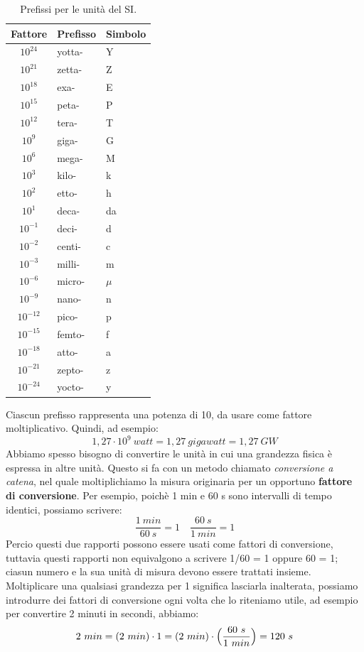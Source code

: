 \documentclass[12pt]{report}
\begin{document}
	\begin{table}[H]
		\centering
		\caption{Prefissi per le unità del SI.}
		\label{tab:prefissi_SI}
		\begin{tabular}{cll}
			\hline
			\textbf{Fattore} & \textbf{Prefisso} & \textbf{Simbolo} \\
			\hline
			$10^{24}$ & yotta- & Y \\
			$10^{21}$ & zetta- & Z \\
			$10^{18}$ & exa- & E \\
			$10^{15}$ & peta- & P \\
			$10^{12}$ & tera- & T \\
			$10^{9}$ & giga- & G \\
			$10^{6}$ & mega- & M \\
			$10^{3}$ & kilo- & k \\
			$10^{2}$ & etto- & h \\
			$10^{1}$ & deca- & da \\
			$10^{-1}$ & deci- & d \\
			$10^{-2}$ & centi- & c \\
			$10^{-3}$ & milli- & m \\
			$10^{-6}$ & micro- & $\mu$ \\
			$10^{-9}$ & nano- & n \\
			$10^{-12}$ & pico- & p \\
			$10^{-15}$ & femto- & f \\
			$10^{-18}$ & atto- & a \\
			$10^{-21}$ & zepto- & z \\
			$10^{-24}$ & yocto- & y \\
			\hline
		\end{tabular}
	\end{table}
	Ciascun prefisso rappresenta una potenza di 10, da usare come fattore moltiplicativo. Quindi, ad esempio:
	\[
	1,27 \cdot 10^9\ watt = 1,27\ gigawatt = 1,27\ GW
	\]
	Abbiamo spesso bisogno di convertire le unità in cui una grandezza fisica  è  espressa in altre unità. Questo si fa con un metodo chiamato \textit{conversione a catena}, nel quale moltiplichiamo la misura originaria per un opportuno \textbf{fattore di conversione}. Per esempio, poichè  1 min e 60 s sono intervalli di tempo identici, possiamo scrivere:
	\[
	\frac{1\ min}{60\ s} = 1 \quad \frac{60\ s}{1\ min} = 1
	\]
	Percio questi due rapporti possono essere usati come fattori di conversione, tuttavia questi rapporti non equivalgono a scrivere 1/60 = 1 oppure 60 = 1; ciasun numero e la sua unità di misura devono essere trattati insieme. \\
	Moltiplicare una qualsiasi grandezza per 1 significa lasciarla inalterata, possiamo introdurre dei fattori di conversione ogni volta che lo riteniamo utile, ad esempio per convertire 2 minuti in secondi, abbiamo:
	\[
	2\ min = (2\ min) \cdot 1 = (2\ min) \cdot \Bigl(\frac{60\ s}{1\ min}\Bigr) = 120\ s
	\]
\end{document}
